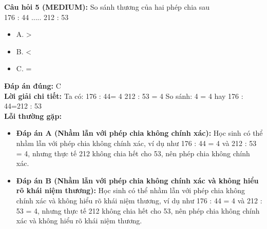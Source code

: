 \documentclass{article}
\begin{document}
\begin{minipage}{\textwidth}
\noindent\textbf{Câu hỏi 5 (MEDIUM):} So sánh thương của hai phép chia sau \\
176 : 44 ..... 212 : 53 
\begin{itemize}[label={}]
    \item A. >
    \item B. <
    \item C. =
\end{itemize}
\textbf{Đáp án đúng:} C \\
\textbf{Lời giải chi tiết:} Ta có: 176 : 44= 4 212 : 53 = 4 So sánh: 4 = 4 hay 176 : 44=212 : 53 \\
\textbf{Lỗi thường gặp:}
\begin{itemize}
  \item \textbf{Đáp án A (Nhầm lẫn với phép chia không chính xác):} Học sinh có thể nhầm lẫn với phép chia không chính xác, ví dụ như 176 : 44 = 4 và 212 : 53 = 4, nhưng thực tế 212 không chia hết cho 53, nên phép chia không chính xác.
  \item \textbf{Đáp án B (Nhầm lẫn với phép chia không chính xác và không hiểu rõ khái niệm thương):} Học sinh có thể nhầm lẫn với phép chia không chính xác và không hiểu rõ khái niệm thương, ví dụ như 176 : 44 = 4 và 212 : 53 = 4, nhưng thực tế 212 không chia hết cho 53, nên phép chia không chính xác và không hiểu rõ khái niệm thương.
\end{itemize}
\end{minipage}
\vspace{1em}
\end{document}
